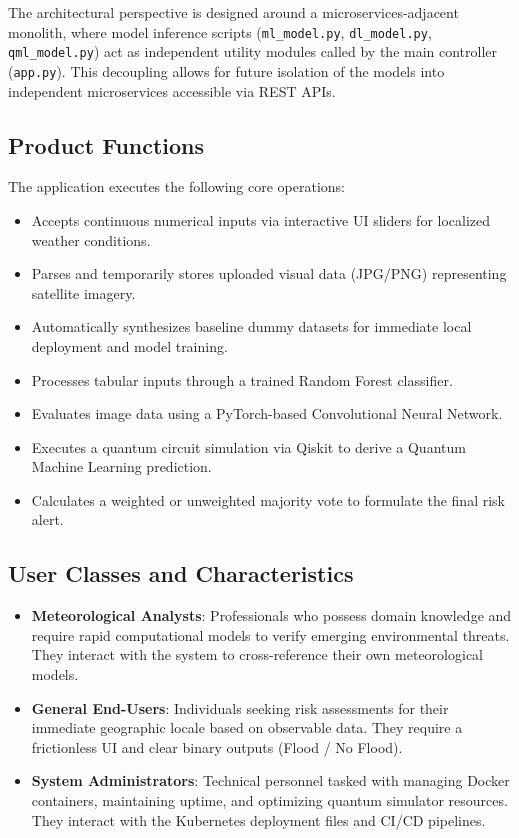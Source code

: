 \documentclass[conference]{IEEEtran}
\begin{document}
The architectural perspective is designed around a microservices-adjacent monolith, where model inference scripts (\texttt{ml\_model.py}, \texttt{dl\_model.py}, \texttt{qml\_model.py}) act as independent utility modules called by the main controller (\texttt{app.py}). This decoupling allows for future isolation of the models into independent microservices accessible via REST APIs.

\subsection{Product Functions}
The application executes the following core operations:
\begin{itemize}
    \item Accepts continuous numerical inputs via interactive UI sliders for localized weather conditions.
    \item Parses and temporarily stores uploaded visual data (JPG/PNG) representing satellite imagery.
    \item Automatically synthesizes baseline dummy datasets for immediate local deployment and model training.
    \item Processes tabular inputs through a trained Random Forest classifier.
    \item Evaluates image data using a PyTorch-based Convolutional Neural Network.
    \item Executes a quantum circuit simulation via Qiskit to derive a Quantum Machine Learning prediction.
    \item Calculates a weighted or unweighted majority vote to formulate the final risk alert.
\end{itemize}

\subsection{User Classes and Characteristics}
\begin{itemize}
    \item \textbf{Meteorological Analysts}: Professionals who possess domain knowledge and require rapid computational models to verify emerging environmental threats. They interact with the system to cross-reference their own meteorological models.
    \item \textbf{General End-Users}: Individuals seeking risk assessments for their immediate geographic locale based on observable data. They require a frictionless UI and clear binary outputs (Flood / No Flood).
    \item \textbf{System Administrators}: Technical personnel tasked with managing Docker containers, maintaining uptime, and optimizing quantum simulator resources. They interact with the Kubernetes deployment files and CI/CD pipelines.
\end{itemize}
\end{document}
